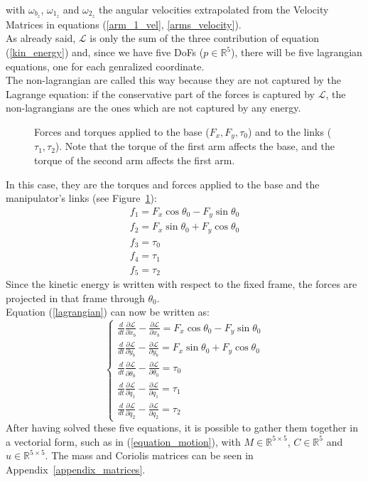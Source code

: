 \documentclass[a4paper,12pt,oneside]{report}
\begin{document}
with $\omega_{b_z}$, $\omega_{1_z}$ and $\omega_{2_z}$ the angular velocities extrapolated from the Velocity Matrices in equations (\ref{arm_1_vel}, \ref{arms_velocity}).\\
As already said, $\mathcal{L}$ is only the sum of the three contribution of equation (\ref{kin_energy}) and, since we have five DoFs ($p \in \mathbb{R} ^5$), there will be five lagrangian equations, one for each genralized coordinate.\\
The non-lagrangian are called this way because they are not captured by the Lagrange equation: if the conservative part of the forces is captured by $\mathcal{L}$, the non-lagrangians are the ones which are not captured by any energy.\\ 
\begin{figure}[h]
  \centering
  
  \caption{Forces and torques applied to the base ($F_x,F_y,\tau_0$) and to the links ($\tau_1,\tau_2$). Note that the torque of the first arm affects the base, and the torque of the second arm affects the first arm.}
  \label{forces}
\end{figure}
In this case, they are the torques and forces applied to the base and the manipulator's links (see Figure~\ref{forces}):
\begin{equation}
  \begin{array}{l}
  f_1=F_x\cos{\theta_0}-F_y\sin{\theta_0}\\
  f_2=F_x\sin{\theta_0}+F_y\cos{\theta_0}\\
  f_3=\tau_0\\
  f_4=\tau_1\\
  f_5=\tau_2
  \end{array}
  \label{non_lagrangian}
\end{equation}
Since the kinetic energy is written with respect to the fixed frame, the forces are projected in that frame through $\theta_0$.\\
Equation (\ref{lagrangian}) can now be written as:
\begin{equation}
  \begin{cases}
    \frac{d}{dt}\frac{\partial \mathcal{L} }{\partial \dot{x}_b}-\frac{\partial \mathcal{L} }{\partial x_b}=F_x\cos{\theta_0}-F_y\sin{\theta_0}\\
    \frac{d}{dt}\frac{\partial \mathcal{L} }{\partial \dot{y}_b}-\frac{\partial \mathcal{L} }{\partial y_b}=F_x\sin{\theta_0}+F_y\cos{\theta_0}\\
    \frac{d}{dt}\frac{\partial \mathcal{L} }{\partial \dot{\theta}_0}-\frac{\partial \mathcal{L} }{\partial \theta_0}=\tau_0\\
    \frac{d}{dt}\frac{\partial \mathcal{L} }{\partial \dot{q}_1}-\frac{\partial \mathcal{L} }{\partial q_1}=\tau_1\\
    \frac{d}{dt}\frac{\partial \mathcal{L} }{\partial \dot{q}_2}-\frac{\partial \mathcal{L} }{\partial q_2}=\tau_2
  \end{cases}
\end{equation}
After having solved these five equations, it is possible to gather them together in a vectorial form, such as in (\ref{equation_motion}), with $M\in\mathbb{R}^{5\times 5}$, $C\in \mathbb{R}^5$ and $u\in\mathbb{R}^{5\times 5}$. The mass and Coriolis matrices can be seen in Appendix~\ref{appendix_matrices}.
\newpage
\end{document}
